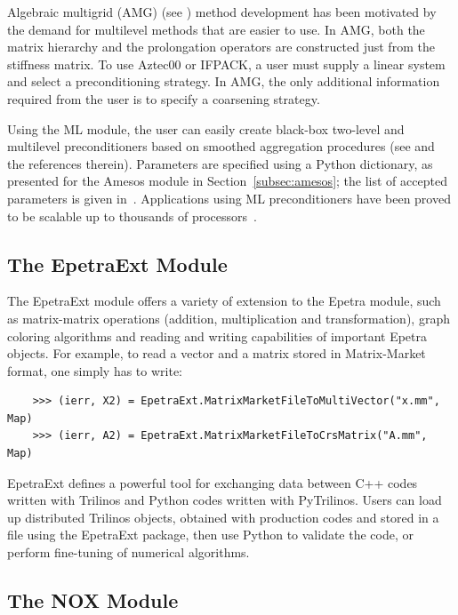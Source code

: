 \documentclass[acmtocl]{acmtrans2m}
\newcommand{\PyTrilinos}{{PyTrilinos}}
\begin{document}
Algebraic multigrid (AMG) (see \cite[Section 8]{Briggs}) method
development has been motivated by the demand for multilevel methods
that are easier to use.  In AMG, both the matrix hierarchy and the
prolongation operators are constructed just from the stiffness matrix.
To use Aztec00 or IFPACK, a user must supply a linear system and
select a preconditioning strategy.  In AMG, the only additional
information required from the user is to specify a coarsening
strategy.

Using the ML module, the user can easily create black-box two-level
and multilevel preconditioners based on smoothed aggregation
procedures (see \cite{sala04analysis,brezina97robust} and the
references therein). Parameters are specified using a Python
dictionary, as presented for the Amesos module in
Section~\ref{subsec:amesos}; the list of accepted parameters is given
in~\cite{ml-guide}. Applications using ML preconditioners have been
proved to be scalable up to thousands of
processors~\cite{ijnme,shadid-jcp-dd-precond}.

\subsection{The EpetraExt Module}
\label{subsec:epetraext}

The EpetraExt module offers a variety of extension to the Epetra
module, such as matrix-matrix operations (addition, multiplication and
transformation), graph coloring algorithms and reading and writing
capabilities of important Epetra objects. For example, to read a
vector and a matrix stored in Matrix-Market format, one simply has to
write:
\begin{verbatim}
    >>> (ierr, X2) = EpetraExt.MatrixMarketFileToMultiVector("x.mm", Map)
    >>> (ierr, A2) = EpetraExt.MatrixMarketFileToCrsMatrix("A.mm", Map)
\end{verbatim}
EpetraExt defines a powerful tool for exchanging data between C++
codes written with Trilinos and Python codes written with
\PyTrilinos. Users can load up distributed Trilinos objects, obtained
with production codes and stored in a file using the EpetraExt
package, then use Python to validate the code, or perform fine-tuning
of numerical algorithms.

\subsection{The NOX Module}
\label{subsec:nox}
\end{document}
